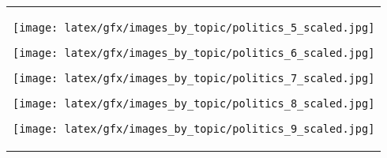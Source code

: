 \begin{table*}[ht]
\begin{tabular}{c}
\begin{minipage}{0.08\textwidth}
                    \end{minipage}
                    \hfill
                    \begin{minipage}{0.08\textwidth}
                        \centering
                        \texttt{[image: latex/gfx/images\_by\_topic/politics\_5\_scaled.jpg]}
                    \end{minipage}
                    \hfill
                    \begin{minipage}{0.08\textwidth}
                        \centering
                        \texttt{[image: latex/gfx/images\_by\_topic/politics\_6\_scaled.jpg]}
                    \end{minipage}
                    \hfill
                    \begin{minipage}{0.08\textwidth}
                        \centering
                        \texttt{[image: latex/gfx/images\_by\_topic/politics\_7\_scaled.jpg]}
                    \end{minipage}
                    \begin{minipage}{0.08\textwidth}
                        \centering
                        \texttt{[image: latex/gfx/images\_by\_topic/politics\_8\_scaled.jpg]}
                    \end{minipage}
                    \begin{minipage}{0.08\textwidth}
                        \centering
                        \texttt{[image: latex/gfx/images\_by\_topic/politics\_9\_scaled.jpg]}
                    \end{minipage}
                \\
                

\end{tabular}
\end{table*}
